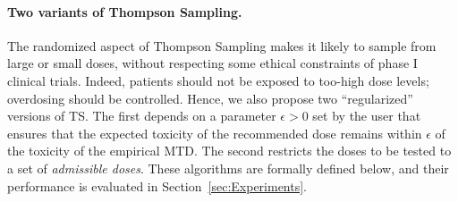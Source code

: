 % 

\paragraph{Two variants of Thompson Sampling.}

The randomized aspect of Thompson Sampling makes it likely to sample from large or small doses, without respecting some ethical constraints of phase I clinical trials. Indeed, patients should not be exposed to too-high dose levels; overdosing should be controlled. Hence, we also propose two ``regularized'' versions of TS. The first depends on a parameter $\epsilon>0$ set by the user that ensures that the expected toxicity of the recommended dose remains within $\epsilon$ of the toxicity of the empirical MTD. The second restricts the doses to be tested to a set of \emph{admissible doses}. These algorithms are formally defined below, and their performance is evaluated in Section~\ref{sec:Experiments}.


